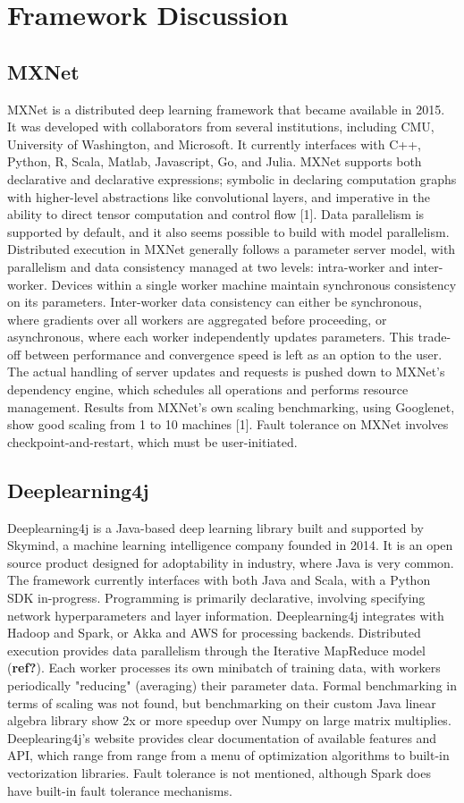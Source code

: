 \documentclass{article}
\begin{document}
\section{Framework Discussion}
\subsection{MXNet}
MXNet is a distributed deep learning framework that became available in 2015. It was developed with collaborators from several institutions, including CMU, University of Washington, and Microsoft. It currently interfaces with C++, Python, R, Scala, Matlab, Javascript, Go, and Julia. MXNet supports both declarative and declarative expressions; symbolic in declaring computation graphs with higher-level abstractions like convolutional layers, and imperative in the ability to direct tensor computation and control flow [1]. Data parallelism is supported by default, and it also seems possible to build with model parallelism. Distributed execution in MXNet generally follows a parameter server model, with parallelism and data consistency managed at two levels: intra-worker and inter-worker. Devices within a single worker machine maintain synchronous consistency on its parameters. Inter-worker data consistency can either be synchronous, where gradients over all workers are aggregated before proceeding, or asynchronous, where each worker independently updates parameters. This trade-off between performance and convergence speed is left as an option to the user. The actual handling of server updates and requests is pushed down to MXNet's dependency engine, which schedules all operations and performs resource management. Results from MXNet's own scaling benchmarking, using Googlenet, show good scaling from 1 to 10 machines [1]. Fault tolerance on MXNet involves checkpoint-and-restart, which must be user-initiated. 

\subsection{Deeplearning4j}
Deeplearning4j is a Java-based deep learning library built and supported by Skymind, a machine learning intelligence company founded in 2014. It is an open source product designed for adoptability in industry, where Java is very common. The framework currently interfaces with both Java and Scala, with a Python SDK in-progress. Programming is primarily declarative, involving specifying network hyperparameters and layer information. Deeplearning4j integrates with Hadoop and Spark, or Akka and AWS for processing backends. Distributed execution provides data parallelism through the Iterative MapReduce model (\textbf{ref?}). Each worker processes its own minibatch of training data, with workers periodically "reducing" (averaging) their parameter data. Formal benchmarking in terms of scaling was not found, but benchmarking on their custom Java linear algebra library show 2x or more speedup over Numpy on large matrix multiplies. Deeplearing4j's website provides clear documentation of available features and API, which range from range from a menu of optimization algorithms to built-in vectorization libraries. Fault tolerance is not mentioned, although Spark does have built-in fault tolerance mechanisms. 
\end{document}
